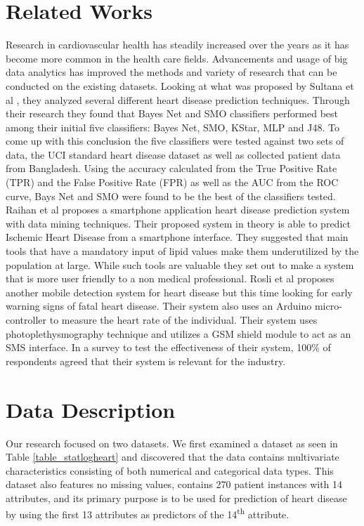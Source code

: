 \documentclass[conference]{IEEEtran}
\begin{document}
\section{Related Works}
Research in cardiovascular health has steadily increased over the years as it has become more common in the health care fields. Advancements and usage of big data analytics has improved the methods and variety of research that can be conducted on the existing datasets. 
Looking at what was proposed by Sultana et al \cite{7873142}, they analyzed several different heart disease prediction techniques. Through their research they found that Bayes Net and SMO classifiers performed best among their initial five classifiers: Bayes Net, SMO, KStar, MLP and J48. To come up with this conclusion the five classifiers were tested against two sets of data, the UCI standard heart disease dataset as well as collected patient data from Bangladesh. Using the accuracy calculated from the True Positive Rate (TPR) and the False Positive Rate (FPR) as well as the AUC from the ROC curve, Bays Net and SMO were found to be the best of the classifiers tested.
   Raihan et al \cite{7860213} proposes a smartphone application heart disease prediction system with data mining techniques. Their proposed system in theory is able to predict Ischemic Heart Disease from a smartphone interface. They suggested that main tools that have a mandatory input of lipid values make them underutilized by the population at large. While such tools are valuable they set out to make a system that is more user friendly to a non medical professional.
   Rosli et al \cite{7808353} proposes another mobile detection system for heart disease but this time looking for early warning signs of fatal heart disease. Their system also uses an Arduino micro-controller to measure the heart rate of the individual. Their system uses photoplethysmography technique and utilizes a GSM shield module to act as an SMS interface. In a survey to test the effectiveness of their system, 100\% of respondents agreed that their system is relevant for the industry.
\section{Data Description}
Our research focused on two datasets. We first examined a dataset as seen in Table \ref{table_statlogheart} and discovered that the data contains multivariate characteristics consisting of both numerical and categorical data types.
This dataset also features no missing values, contains 270 patient instances with 14 attributes, and its primary purpose is to be used for prediction of heart disease by using the first 13 attributes as predictors of the 14\textsuperscript{th} attribute.
\end{document}
